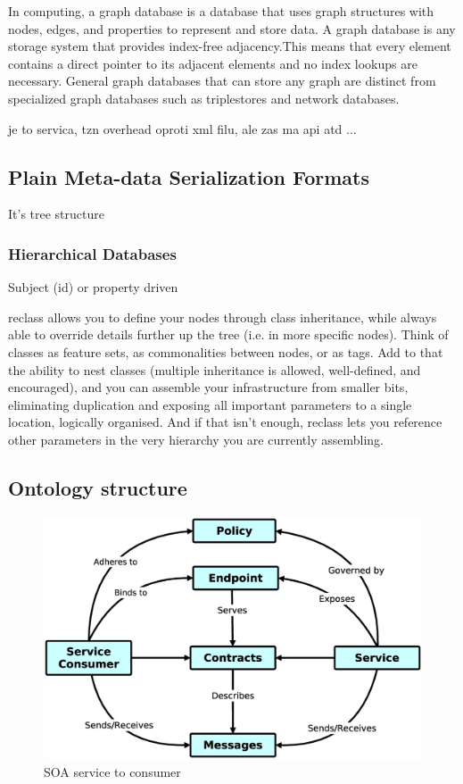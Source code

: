 In computing, a graph database is a database that uses graph structures with nodes, edges, and properties to represent and store data. A graph database is any storage system that provides index-free adjacency.This means that every element contains a direct pointer to its adjacent elements and no index lookups are necessary. General graph databases that can store any graph are distinct from specialized graph databases such as triplestores and network databases.


je to servica, tzn overhead oproti xml filu, ale zas ma api atd ...

\subsection{Plain Meta-data Serialization Formats}

It's tree structure

\subsubsection{Hierarchical Databases}

Subject (id) or property driven

reclass allows you to define your nodes through class inheritance, while always able to override details further up the tree (i.e. in more specific nodes). Think of classes as feature sets, as commonalities between nodes, or as tags. Add to that the ability to nest classes (multiple inheritance is allowed, well-defined, and encouraged), and you can assemble your infrastructure from smaller bits, eliminating duplication and exposing all important parameters to a single location, logically organised. And if that isn’t enough, reclass lets you reference other parameters in the very hierarchy you are currently assembling.


\subsection{Ontology structure}

\begin{figure}[!h]
\centering
\includegraphics[scale=.2]{img/soa_relation.eps}
\caption{SOA service to consumer}
\label{fig:cm}
\end{figure}


